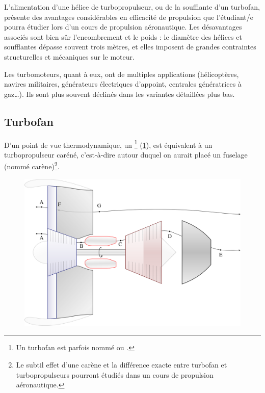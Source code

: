 {{		L’alimentation d’une hélice de turbopropulseur, ou de la soufflante d’un turbofan, présente des avantages considérables en efficacité de propulsion que l’étudiant/e pourra étudier lors d’un cours de propulsion aéronautique. Les désavantages associés sont bien sûr l’encombrement et le poids : le diamètre des hélices et soufflantes dépasse souvent trois mètres, et elles imposent de grandes contraintes structurelles et mécaniques sur le moteur.

		Les turbomoteurs, quant à eux, ont de multiples applications (hélicoptères, navires militaires, générateurs électriques d’appoint, centrales génératrices à gaz…). Ils sont plus souvent déclinés dans les variantes détaillées plus bas.

		 

	\subsection{Turbofan}

		D’un point de vue thermodynamique, un \footnote{Un turbofan est parfois nommé  ou .} (\cref{fig_turbofan}), est équivalent à un turbopropulseur caréné, c’est-à-dire autour duquel on aurait placé un fuselage (nommé carène)\footnote{Le subtil effet d’une carène et la différence exacte entre turbofan et turbopropulseurs pourront étudiés dans un cours de propulsion aéronautique.}. 
		
		\begin{figure}
			\begin{center}
				\includegraphics[scale=0.6]{images/circuit_turbofan.png}
			\end{center}
			\label{fig_turbofan}
		\end{figure}
		
}}
